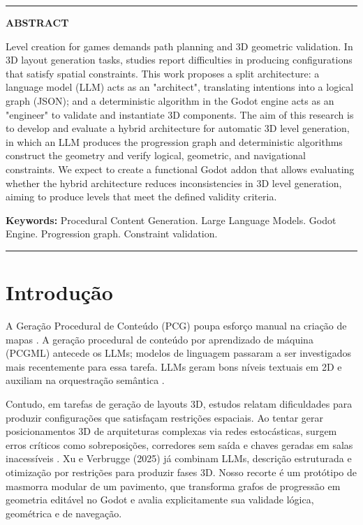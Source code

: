 \documentclass[
  12pt,
  a4paper,
  oneside,
  article,
  brazil
]{abntex2}
\begin{document}
\vspace{0.1cm}
\noindent\rule{\linewidth}{0.4pt}
\vspace{0.1cm}

{\centering\textbf{ABSTRACT}\par}
\vspace{0.1cm}
\begin{SingleSpace}
\noindent
Level creation for games demands path planning and 3D geometric validation. In 3D layout generation tasks, studies report difficulties in producing configurations that satisfy spatial constraints. This work proposes a split architecture: a language model (LLM) acts as an "architect", translating intentions into a logical graph (JSON); and a deterministic algorithm in the Godot engine acts as an "engineer" to validate and instantiate 3D components. The aim of this research is to develop and evaluate a hybrid architecture for automatic 3D level generation, in which an LLM produces the progression graph and deterministic algorithms construct the geometry and verify logical, geometric, and navigational constraints. We expect to create a functional Godot addon that allows evaluating whether the hybrid architecture reduces inconsistencies in 3D level generation, aiming to produce levels that meet the defined validity criteria.

\vspace{0.1cm}
\noindent\textbf{Keywords:} Procedural Content Generation. Large Language Models. Godot Engine. Progression graph. Constraint validation.
\end{SingleSpace}

\vspace{0.1cm}
\noindent\rule{\linewidth}{1pt}
\vspace{0.1cm}

\section{Introdução}

A Geração Procedural de Conteúdo (PCG) poupa esforço manual na criação de mapas \cite{summerville2018procedural}. A geração procedural de conteúdo por aprendizado de máquina (PCGML) antecede os LLMs; modelos de linguagem passaram a ser investigados mais recentemente para essa tarefa. LLMs geram bons níveis textuais em 2D \cite{todd2023level} e auxiliam na orquestração semântica \cite{tang2025unrealllm}.

Contudo, em tarefas de geração de layouts 3D, estudos relatam dificuldades para produzir configurações que satisfaçam restrições espaciais. Ao tentar gerar posicionamentos 3D de arquiteturas complexas via redes estocásticas, surgem erros críticos como sobreposições, corredores sem saída e chaves geradas em salas inacessíveis \cite{xu2025constraint, sun2024roomplanner}. Xu e Verbrugge (2025) já combinam LLMs, descrição estruturada e otimização por restrições para produzir fases 3D. Nosso recorte é um protótipo de masmorra modular de um pavimento, que transforma grafos de progressão em geometria editável no Godot e avalia explicitamente sua validade lógica, geométrica e de navegação.
\end{document}
